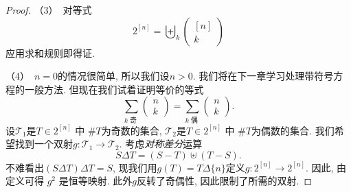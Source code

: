 \documentclass{ctexbook}
\begin{document}
\begin{proof}
    	（3）\ 对等式$$2^{[n]}=\biguplus_{k}\left(\begin{array}{c}{[n]} \\ k\end{array}\right)$$应用求和规则即得证.

    	（4）\ $n=0$的情况很简单, 所以我们设$n>0$. 我们将在下一章学习处理带符号方程的一般方法. 但现在我们试着证明等价的等式
    	$$
    	\sum_{k \text { 奇 }}\left(\begin{array}{l}
    	n \\ k
    	\end{array}\right)=\sum_{k \text { 偶 }}\left(\begin{array}{l}
    	n \\ k
    	\end{array}\right).
    	$$
    	设$\mathcal{T}_{1}$是$T \in 2^{[n]}$ 中 $\# T$为奇数的集合, $\mathcal{T}_{2}$是$T \in 2^{[n]}$ 中 $\# T$为偶数的集合.
    	我们希望找到一个双射$g: \mathcal{T}_{1} \rightarrow \mathcal{T}_{2}$. 考虑\textsl{对称差分}运算
    	$$
    	S \Delta T=(S-T) \uplus(T-S).
    	$$
    	不难看出$(S \Delta T) \Delta T=S$, 现我们用$g(T)=T \Delta\{n\}$定义$g: 2^{[n]} \rightarrow 2^{[n]}$. 因此, 由定义可得 $g^{2}$
    	是恒等映射. 此外$g$反转了奇偶性, 因此限制了所需的双射.
    \end{proof}
\end{document}

